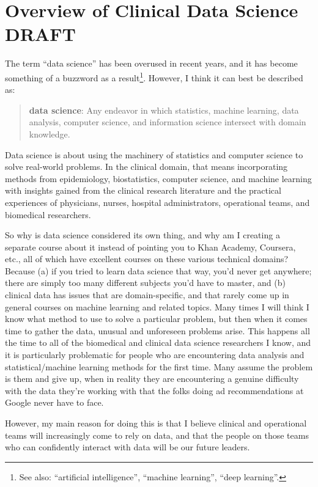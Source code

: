 \chapter{Overview of Clinical Data Science {\color{red} DRAFT} \label{chapter:overview}}

The term ``data science'' has been overused in recent years, and it has become something of a buzzword as a result\footnote{See also: ``artificial intelligence'', ``machine learning'', ``deep learning''.}. However, I think it can best be described as: 
\begin{quote}
\textbf{data science}: Any endeavor in which statistics, machine learning, data analysis, computer science, and information science intersect with domain knowledge.
\end{quote}
Data science is about using the machinery of statistics and computer science to solve real-world problems. In the clinical domain, that means incorporating methods from epidemiology, biostatistics, computer science, and machine learning with insights gained from the clinical research literature and the practical experiences of physicians, nurses, hospital administrators, operational teams, and biomedical researchers.

So why is data science considered its own thing, and why am I creating a separate course about it instead of pointing you to Khan Academy, Coursera, etc., all of which have excellent courses on these various technical domains? Because (a) if you tried to learn data science that way, you'd never get anywhere; there are simply too many different subjects you'd have to master, and (b) clinical data has issues that are domain-specific, and that rarely come up in general courses on machine learning and related topics. Many times I will think I know what method to use to solve a particular problem, but then when it comes time to gather the data, unusual and unforeseen problems arise. This happens all the time to all of the biomedical and clinical data science researchers I know, and it is particularly problematic for people who are encountering data analysis and statistical/machine learning methods for the first time. Many assume the problem is them and give up, when in reality they are encountering a genuine difficulty with the data they're working with that the folks doing ad recommendations at Google never have to face.

However, my main reason for doing this is that I believe clinical and operational teams will increasingly come to rely on data, and that the people on those teams who can confidently interact with data will be our future leaders.

